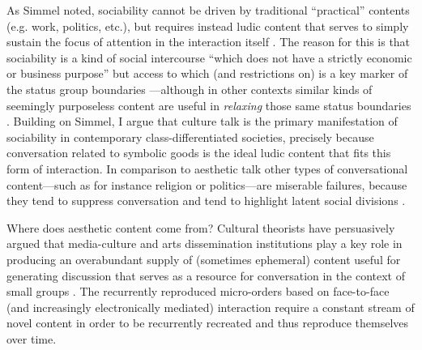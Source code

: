 As Simmel noted, sociability cannot be driven by traditional ``practical'' contents (e.g. work, politics, etc.), but requires instead ludic content that serves to simply sustain the focus of attention in the interaction itself \citep{collins75}. The reason for this is that sociability is a kind of social intercourse ``which does not have a strictly economic or business purpose'' but access to which (and restrictions on) is a key marker of the status group boundaries \citep[114]{weber94}---although in other contexts similar kinds of seemingly purposeless content are useful in \emph{relaxing} those same status boundaries \citep{ikegami05}. Building on Simmel, I argue that culture talk is the primary manifestation of sociability in contemporary class-differentiated societies, precisely because conversation related to symbolic goods is the ideal ludic content that fits this form of interaction. In comparison to aesthetic talk other types of conversational content---such as for instance religion or politics---are miserable failures, because they tend to suppress conversation and tend to highlight latent social divisions \citep{eliasoph98}.

Where does aesthetic content come from? Cultural theorists have persuasively argued that media-culture and arts dissemination institutions play a key role in producing an overabundant supply of (sometimes ephemeral) content useful for generating discussion that serves as a resource for conversation in the context of small groups  \citep[453]{fine77}.  The recurrently reproduced micro-orders based on face-to-face (and increasingly electronically mediated) interaction require a constant stream of novel content in order to be recurrently recreated and thus reproduce themselves over time. 

